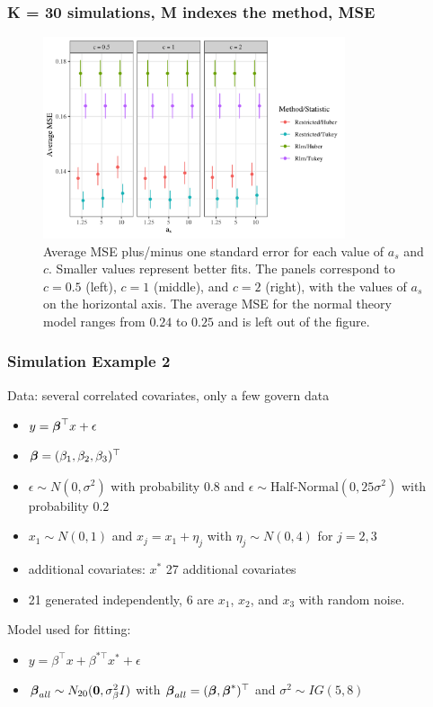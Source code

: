 \documentclass{beamer}
\def\bbeta{\mbox{\boldmath $\beta$}}
\newcommand{\mb}{\mathbf}
\begin{document}
\begin{frame}
	\frametitle{K = 30 simulations, M indexes the method, MSE}
\begin{figure}[t]
	\centering
	\includegraphics[width = 3.5in]{mse_sim2_facet_scale.png}
	\caption{Average MSE plus/minus one standard error for each value of $a_{s}$ and $c$. Smaller values represent better fits. The panels correspond to $c = 0.5$ (left), $c=1$ (middle), and $c=2$ (right), with the values of $a_{s}$ on the horizontal axis. The average MSE for the normal theory model ranges from $0.24$ to $0.25$ and is left out of the figure.}
\end{figure}
	
\end{frame}

\begin{frame}
\frametitle{Simulation Example 2}
Data: several correlated covariates, only a few govern data
\begin{itemize}
	\item	$y = \bbeta^{\top}x + \epsilon$
	\item $\bbeta = (\beta_{1}, \beta_{2},\beta_{3})^{\top}$
	\item $\epsilon \sim N(0,\sigma^{2})$ with probability $0.8$ and $\epsilon \sim \text{Half-Normal}(0,25\sigma^{2})$ with probability $0.2$
	\item $x_1 \sim N(0,1)$ and $x_{j} = x_{1} + \eta_{j}$ with $\eta_{j} \sim N(0, 4)$ for $j = 2,3$
	\item additional covariates: $x^{*}$  27 additional covariates
	\item 21 generated independently, 6 are $x_{1}$, $x_{2}$, and $x_{3}$ with random noise.
\end{itemize}
Model used for fitting:
\begin{itemize}
	\item $y = \beta^{\top} x + \beta^{*\top} x^{*} + \epsilon$
	\item $\bbeta_{all}\sim N_{20}(\mb{0}, \sigma^{2}_{\beta}I)$ with $\bbeta_{all} = (\bbeta, \bbeta^{*})^{\top}$ and $\sigma^{2}\sim IG(5,8)$ 
\end{itemize}
\end{frame}
\end{document}
